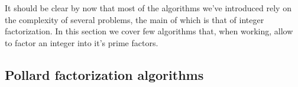 \documentclass{subfiles}
\begin{document}
    It should be clear  by now that most of the algorithms we've introduced rely on the complexity
        of several problems, the main of which is that of integer factorization.
        In this section we cover few algorithms that, when working\footnotemark,
        allow to factor an integer into it's prime factors.



    \subsection{Pollard factorization algorithms}
    
\end{document}
